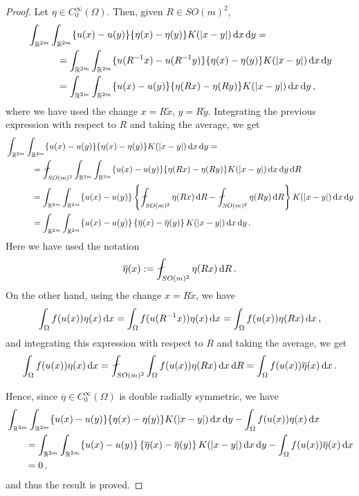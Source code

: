 \begin{proof}
	Let $\eta \in C^\infty_0(\Omega)$. Then, given $R\in SO(m)^2$, 
	\begin{align*}
	&\int_{\mathbb{R}^{2m}}\int_{\mathbb{R}^{2m}} \{u(x)-u(y)\}\{\eta(x)-\eta(y)\} K(|x-y|) \,\mathrm{d} x \,\mathrm{d} y = \\
	&\quad \quad \quad = \int_{\mathbb{R}^{2m}}\int_{\mathbb{R}^{2m}} \{u(R^{-1}x)-u(R^{-1}y)\}\{\eta(x)-\eta(y)\} K(|x-y|) \,\mathrm{d} x \,\mathrm{d} y \\
	&\quad \quad \quad = \int_{\mathbb{R}^{2m}}\int_{\mathbb{R}^{2m}} \{u(x)-u(y)\}\{\eta(R x)-\eta(R y)\} K(|x-y|) \,\mathrm{d} x \,\mathrm{d} y\,,
	\end{align*}
	where we have used the change $x = R\tilde{x}$, $y = R \tilde{y}$. Integrating the previous expression with respect to $R$ and taking the average, we get
	\begin{align*}
	& \int_{\R^{2m}}\int_{\R^{2m}} \{u(x)-u(y)\}\{\eta(x)-\eta(y)\} K(|x-y|) \d x \d y = \\
	&\quad \quad \quad =\average_{SO(m)^2} \int_{\R^{2m}}\int_{\R^{2m}} \{u(x)-u(y)\}\{\eta(R x)-\eta(R y)\} K(|x-y|) \d x \d y \d R \\
	&\quad \quad \quad= \int_{\R^{2m}}\int_{\R^{2m}} \{u(x)-u(y)\}\left \{\average_{SO(m)^2}\eta(R x)\d R-\average_{SO(m)^2} \eta(Ry) \d R \right \} K(|x-y|) \d x \d y \\
	&\quad \quad \quad= \int_{\R^{2m}}\int_{\R^{2m}} \{u(x)-u(y)\}\left \{\overline{\eta}(x) -\overline{\eta}(y)  \right \} K(|x-y|) \d x \d y \,.
	\end{align*}
	Here we have used the notation
	$$
	\overline{\eta}(x) := \average_{SO(m)^2}\eta(R x)\d R\,.
	$$
	On the other hand, using the change $x = R\tilde{x}$, we have
	$$
	\int_{\Omega} f(u(x)) \eta(x) \,\mathrm{d} x = \int_{\Omega} f(u(R^{-1}x)) \eta(x) \,\mathrm{d} x = \int_{\Omega} f(u(x)) \eta(Rx) \,\mathrm{d} x\,,
	$$
	and integrating this expression with respect to $R$ and taking the average, we get
	$$
	\int_{\Omega} f(u(x)) \eta(x) \d x = \average_{SO(m)^2} \int_{\Omega} f(u(x)) \eta(Rx) \d x \d R = \int_{\Omega} f(u(x))\overline{\eta}(x) \d x\,.  
	$$
	
	Hence, since $\overline{\eta} \in C^\infty_0(\Omega)$ is double radially symmetric, we have
	\begin{align*}
		&\int_{\mathbb{R}^{2m}}\int_{\mathbb{R}^{2m}} \{u(x)-u(y)\}\{\eta(x)-\eta(y)\} K(|x-y|) \,\mathrm{d} x \,\mathrm{d} y - \int_{\Omega} f(u(x)) \eta(x) \,\mathrm{d} x \\
		&\quad \quad= \int_{\mathbb{R}^{2m}}\int_{\mathbb{R}^{2m}} \{u(x)-u(y)\}\left \{\overline{\eta}(x) -\overline{\eta}(y)  \right \} K(|x-y|) \,\mathrm{d} x \,\mathrm{d} y - \int_{\Omega} f(u(x))\overline{\eta}(x) \,\mathrm{d} x \\
		&\quad \quad= 0\,,
	\end{align*}
	and thus the result is proved.
\end{proof}

